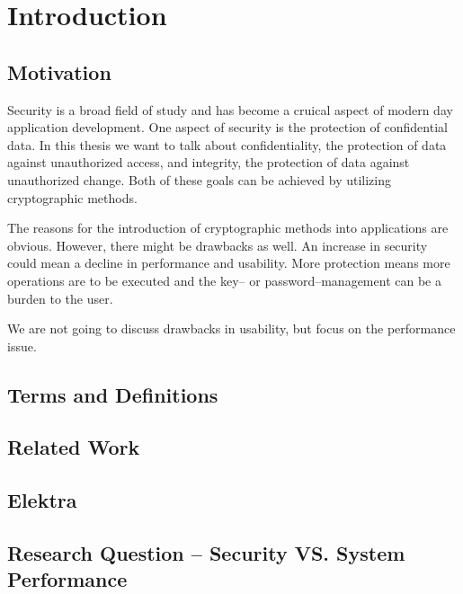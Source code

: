 \chapter{Introduction}

\section{Motivation}

Security is a broad field of study and has become a cruical aspect of modern day application development.
One aspect of security is the protection of confidential data.
In this thesis we want to talk about confidentiality, the protection of data against unauthorized access, and integrity, the protection of data against unauthorized change.
Both of these goals can be achieved by utilizing cryptographic methods.

The reasons for the introduction of cryptographic methods into applications are obvious.
However, there might be drawbacks as well.
An increase in security could mean a decline in performance and usability.
More protection means more operations are to be executed and the key-- or password--management can be a burden to the user.

We are not going to discuss drawbacks in usability, but focus on the performance issue.



\section{Terms and Definitions}

\section{Related Work}

\section{Elektra}

\section{Research Question -- Security VS. System Performance}